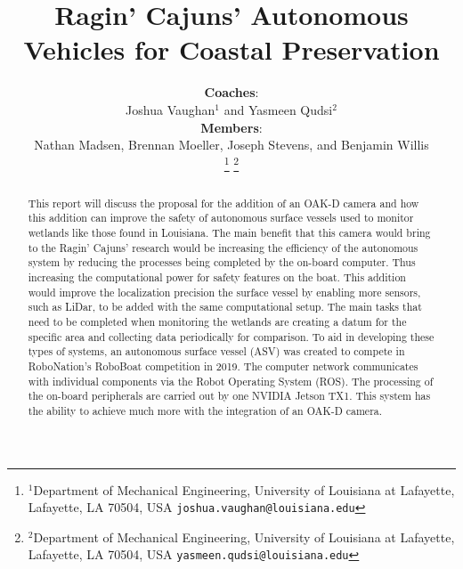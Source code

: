 \documentclass[letterpaper, 12 pt, conference]{ieeeconf}
\begin{document}
\title{\LARGE \bf Ragin' Cajuns' Autonomous Vehicles for Coastal Preservation}


\author{\textbf{Coaches}:\\Joshua Vaughan$^{1}$ and Yasmeen Qudsi$^2$ \\%
\textbf{Members}:\\Nathan Madsen, Brennan Moeller, Joseph Stevens, and Benjamin Willis \\
\thanks{$^{1}$Department of Mechanical Engineering,
        University of Louisiana at Lafayette, Lafayette, LA 70504, USA
        {\tt\small joshua.vaughan@louisiana.edu}}%
\thanks{$^{2}$Department of Mechanical Engineering,
        University of Louisiana at Lafayette, Lafayette, LA 70504, USA
        {\tt\small yasmeen.qudsi@louisiana.edu}}%
}


\pagestyle{fancyplain}
\rhead{\footnotesize{\thepage}}
\cfoot{}


\maketitle
\thispagestyle{fancyplain}
%
\begin{abstract}
This report will discuss the proposal for the addition of an OAK-D camera and how this addition can improve the safety of autonomous surface vessels used to monitor wetlands like those found in Louisiana. The main benefit that this camera would bring to the Ragin' Cajuns' research would be increasing the efficiency of the autonomous system by reducing the processes being completed by the on-board computer. Thus increasing the computational power for safety features on the boat. This addition would improve the localization precision the surface vessel by enabling more sensors, such as LiDar, to be added with the same computational setup. The main tasks that need to be completed when monitoring the wetlands are creating a datum for the specific area and collecting data periodically for comparison. To aid in developing these types of systems, an autonomous surface vessel (ASV) was created to compete in RoboNation's RoboBoat competition in 2019. The computer network communicates with individual components via the Robot Operating System (ROS). The processing of the on-board peripherals are carried out by one NVIDIA Jetson TX1. This system has the ability to achieve much more with the integration of an OAK-D camera.
\end{abstract}
\end{document}
